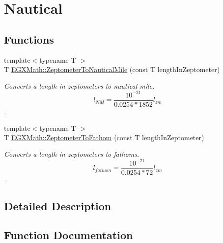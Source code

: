 \hypertarget{group___e_g_x_math-_conversions-_length_conversions-_zeptometer-_nautical}{}\section{Nautical}
\label{group___e_g_x_math-_conversions-_length_conversions-_zeptometer-_nautical}
\subsection*{Functions}
\begin{DoxyCompactItemize}
\item 
{\footnotesize template$<$typename T $>$ }\\T \mbox{\hyperlink{group___e_g_x_math-_conversions-_length_conversions-_zeptometer-_nautical_ga9d6a1de6b4a8de39ba16da0a17cdca42}{E\+G\+X\+Math\+::\+Zeptometer\+To\+Nautical\+Mile}} (const T length\+In\+Zeptometer)
\begin{DoxyCompactList}\small\item\em Converts a length in zeptometers to nautical mile. \[ l_{NM}= \frac{10^{-21}}{0.0254 * 1852} l_{zm} \]. \end{DoxyCompactList}\item 
{\footnotesize template$<$typename T $>$ }\\T \mbox{\hyperlink{group___e_g_x_math-_conversions-_length_conversions-_zeptometer-_nautical_ga338ca94378cf11aca399ecdfc859950a}{E\+G\+X\+Math\+::\+Zeptometer\+To\+Fathom}} (const T length\+In\+Zeptometer)
\begin{DoxyCompactList}\small\item\em Converts a length in zeptometers to fathoms. \[ l_{fathom}= \frac{10^{-21}}{0.0254 * 72} l_{zm} \]. \end{DoxyCompactList}\end{DoxyCompactItemize}


\subsection{Detailed Description}


\subsection{Function Documentation}
\mbox{\label{group___e_g_x_math-_conversions-_length_conversions-_zeptometer-_nautical_ga338ca94378cf11aca399ecdfc859950a}} 
